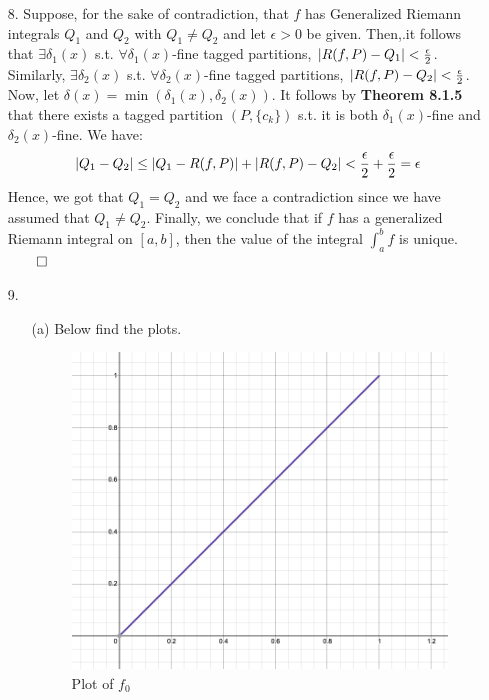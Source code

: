 \documentclass[11pt]{article}
\DeclarePairedDelimiter\abs{\lvert}{\rvert}%
\begin{document}
\begin{itemize}
    \item[8.]
        Suppose, for the sake of contradiction, that $f$ has Generalized
        Riemann integrals $Q_1$ and $Q_2$ with $Q_1 \neq Q_2$ and let $\epsilon
        > 0$ be given. Then,.it follows that $\exists \delta_1(x)$ s.t.
        $\forall \delta_1(x)$-fine tagged partitions, $\abs{R(f, P) - Q_1} <
        \frac{\epsilon}{2}$. Similarly, $\exists \delta_2(x)$ s.t. $\forall
        \delta_2(x)$-fine tagged partitions, $\abs{R(f, P) - Q_2} <
        \frac{\epsilon}{2}$. Now, let $\delta(x) = \min (\delta_1(x),
        \delta_2(x))$. It follows by \textbf{Theorem 8.1.5} that there exists a
        tagged partition $(P, \{c_k\})$ s.t. it is both $\delta_1(x)$-fine and
        $\delta_2(x)$-fine. We have:
        \begin{equation*}
            \abs{Q_1 - Q_2} \leq \abs{Q_1 - R(f, P)} + \abs{R(f, P) - Q_2}
                            < \frac{\epsilon}{2} + \frac{\epsilon}{2}
                            = \epsilon
        \end{equation*}
        Hence, we got that $Q_1 = Q_2$ and we face a contradiction since we
        have assumed that $Q_1 \neq Q_2$. Finally, we conclude that if $f$ has
        a generalized Riemann integral on $[a, b]$, then the value of the
        integral $\int_a^b f$ is unique.\\
        $\qed$

    \clearpage

    \item[9.]
        \begin{itemize}
            \item[(a)]
                Below find the plots.

                \begin{figure}[H]
                    \centering
                    \includegraphics[width=0.5\linewidth]{f_0_plot.png}
                    \caption{Plot of $f_0$}
                \end{figure}


\end{itemize}
\end{itemize}
\end{document}
